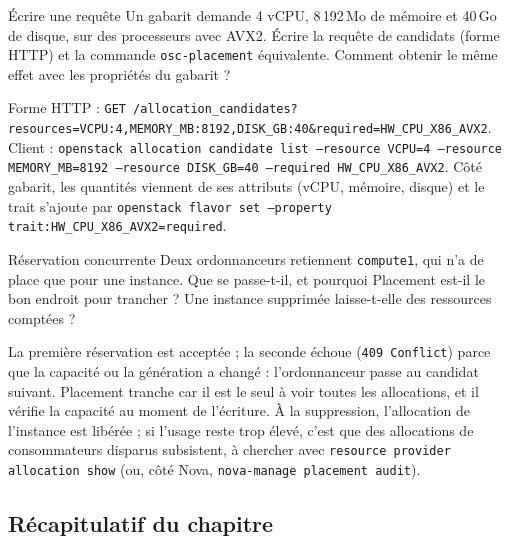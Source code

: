 \begin{exercice}{Écrire une requête}\label{ex:pl-requete}
Un gabarit demande 4 vCPU, 8\,192\,Mo de mémoire et 40\,Go de disque, sur des processeurs avec AVX2. Écrire la
requête de candidats (forme HTTP) et la commande \texttt{osc-placement} équivalente. Comment obtenir le même
effet avec les propriétés du gabarit ?
\end{exercice}
\begin{correction}
Forme HTTP : \texttt{GET /allocation\_\allowbreak candidates?\allowbreak resources=VCPU:4,\allowbreak MEMORY\_MB:8192,\allowbreak DISK\_GB:40\&\allowbreak required=\allowbreak HW\_CPU\_X86\_AVX2}.
Client : \texttt{openstack allocation candidate list --resource VCPU=4 --resource MEMORY\_MB=8192 --resource DISK\_GB=40 --required HW\_CPU\_X86\_AVX2}. Côté gabarit, les quantités viennent de ses attributs (vCPU, mémoire, disque) et le trait
s'ajoute par \texttt{openstack flavor set --property trait:HW\_CPU\_X86\_AVX2=required}.
\end{correction}

\begin{exercice}{Réservation concurrente}\label{ex:pl-concurrence}
Deux ordonnanceurs retiennent \texttt{compute1}, qui n'a de place que pour une instance. Que se passe-t-il, et pourquoi
Placement est-il le bon endroit pour trancher ? Une instance supprimée laisse-t-elle des ressources comptées ?
\end{exercice}
\begin{correction}
La première réservation est acceptée ; la seconde échoue (\texttt{409 Conflict}) parce que la capacité ou la génération a
changé : l'ordonnanceur passe au candidat suivant. Placement tranche car il est le seul à voir toutes les allocations,
et il vérifie la capacité au moment de l'écriture. À la suppression, l'allocation de l'instance est libérée ; si l'usage
reste trop élevé, c'est que des allocations de consommateurs disparus subsistent, à chercher avec
\texttt{resource provider allocation show} (ou, côté Nova, \texttt{nova-manage placement audit}).
\end{correction}

\subsection{Récapitulatif du chapitre}\label{sec:pl-recap}


